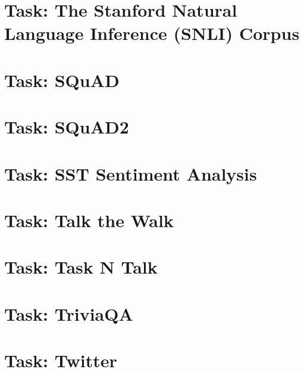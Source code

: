 \documentclass[twoside]{book}
\newcommand{\+}{\discretionary{\mbox{\scriptsize$\hookleftarrow$}}{}{}}
\begin{document}
\chapter{Task\+: The Stanford Natural Language Inference (S\+N\+LI) Corpus}
\label{md_parlai_tasks_snli_README}

\chapter{Task\+: S\+Qu\+AD}
\label{md_parlai_tasks_squad_README}

\chapter{Task\+: S\+Qu\+A\+D2}
\label{md_parlai_tasks_squad2_README}

\chapter{Task\+: S\+ST Sentiment Analysis}
\label{md_parlai_tasks_sst_README}

\chapter{Task\+: Talk the Walk}
\label{md_parlai_tasks_talkthewalk_README}

\chapter{Task\+: Task N\textquotesingle{} Talk}
\label{md_parlai_tasks_taskntalk_README}

\chapter{Task\+: Trivia\+QA}
\label{md_parlai_tasks_triviaqa_README}

\chapter{Task\+: Twitter}
\label{md_parlai_tasks_twitter_README}

\end{document}
